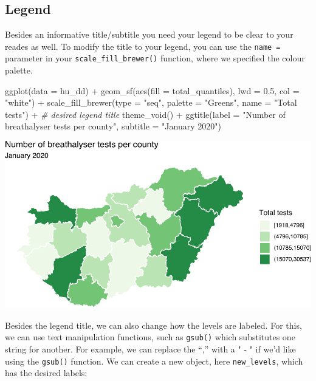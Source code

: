 \documentclass[
]{book}
\newenvironment{Shaded}{\begin{snugshade}}{\end{snugshade}}
\newcommand{\AttributeTok}[1]{\textcolor[rgb]{0.77,0.63,0.00}{#1}}
\newcommand{\CommentTok}[1]{\textcolor[rgb]{0.56,0.35,0.01}{\textit{#1}}}
\newcommand{\FloatTok}[1]{\textcolor[rgb]{0.00,0.00,0.81}{#1}}
\newcommand{\FunctionTok}[1]{\textcolor[rgb]{0.00,0.00,0.00}{#1}}
\newcommand{\NormalTok}[1]{#1}
\newcommand{\SpecialCharTok}[1]{\textcolor[rgb]{0.00,0.00,0.00}{#1}}
\newcommand{\StringTok}[1]{\textcolor[rgb]{0.31,0.60,0.02}{#1}}
\begin{document}
\hypertarget{legend}{%
\subsection{Legend}\label{legend}}

Besides an informative title/subtitle you need your legend to be clear to your reades as well. To modify the title to your legend, you can use the \texttt{name\ =} parameter in your \texttt{scale\_fill\_brewer()} function, where we specified the colour palette.

\begin{Shaded}
\begin{Highlighting}[]
\FunctionTok{ggplot}\NormalTok{(}\AttributeTok{data =}\NormalTok{ hu\_dd) }\SpecialCharTok{+} 
  \FunctionTok{geom\_sf}\NormalTok{(}\FunctionTok{aes}\NormalTok{(}\AttributeTok{fill =}\NormalTok{ total\_quantiles), }
          \AttributeTok{lwd =} \FloatTok{0.5}\NormalTok{, }\AttributeTok{col =} \StringTok{"white"}\NormalTok{) }\SpecialCharTok{+} 
  \FunctionTok{scale\_fill\_brewer}\NormalTok{(}\AttributeTok{type =} \StringTok{"seq"}\NormalTok{, }\AttributeTok{palette =} \StringTok{"Greens"}\NormalTok{, }
                    \AttributeTok{name =} \StringTok{"Total tests"}\NormalTok{) }\SpecialCharTok{+} \CommentTok{\# desired legend title}
  \FunctionTok{theme\_void}\NormalTok{() }\SpecialCharTok{+} 
  \FunctionTok{ggtitle}\NormalTok{(}\AttributeTok{label =} \StringTok{"Number of breathalyser tests per county"}\NormalTok{, }
          \AttributeTok{subtitle =} \StringTok{"January 2020"}\NormalTok{)}
\end{Highlighting}
\end{Shaded}

\includegraphics{crime_mapping_files/figure-latex/legend-1.pdf}

Besides the legend title, we can also change how the levels are labeled. For this, we can use text manipulation functions, such as \texttt{gsub()} which substitutes one string for another. For example, we can replace the ``,'' with a " - " if we'd like using the \texttt{gsub()} function. We can create a new object, here \texttt{new\_levels}, which has the desired labels:
\end{document}

